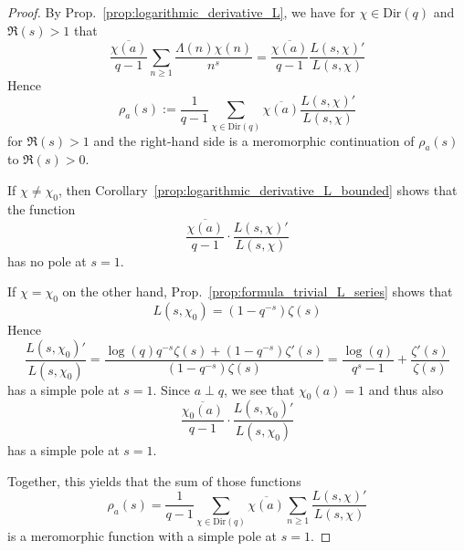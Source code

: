 \documentclass{scrartcl}
\theoremstyle{definition}
\begin{document}
\begin{proof}
    By Prop.~\ref{prop:logarithmic_derivative_L}, we have for $\chi \in \mathrm{Dir}(q)$ and $\Re(s) > 1$ that
    \begin{equation*}
        \frac {\overline{\chi(a)}} {q - 1} \sum_{n \geq 1} \frac {\Lambda(n) \chi(n)} {n^s} = \frac {\overline{\chi(a)}} {q - 1} \frac {L(s, \chi)'} {L(s, \chi)}
    \end{equation*}
    Hence
    \begin{equation*}
        \rho_a(s) := \frac 1 {q - 1} \sum_{\chi \in \mathrm{Dir}(q)} \overline{\chi(a)} \frac {L(s, \chi)'} {L(s, \chi)}
    \end{equation*}
    for $\Re(s) > 1$ and the right-hand side is a meromorphic continuation of $\rho_a(s)$ to $\Re(s) > 0$.

    If $\chi \neq \chi_0$, then Corollary~\ref{prop:logarithmic_derivative_L_bounded} shows that the function
    \begin{equation*}
        \frac {\overline{\chi(a)}} {q - 1} \cdot \frac {L(s, \chi)'} {L(s, \chi)}
    \end{equation*}
    has no pole at $s = 1$.
    
    If $\chi = \chi_0$ on the other hand, Prop.~\ref{prop:formula_trivial_L_series} shows that
    \begin{equation*}
        L(s, \chi_0) = (1 - q^{-s}) \zeta(s)
    \end{equation*}
    Hence
    \begin{equation*}
        \frac {L(s, \chi_0)'} {L(s, \chi_0)} = \frac { \log(q)q^{-s} \zeta(s) + (1 - q^{-s}) \zeta'(s) } { (1 - q^{-s})\zeta(s) } = \frac {\log(q)} {q^s - 1} + \frac {\zeta'(s)} {\zeta(s)}
    \end{equation*}
    has a simple pole at $s = 1$.
    Since $a \perp q$, we see that $\chi_0(a) = 1$ and thus also
    \begin{equation*}
        \frac {\overline{\chi_0(a)}} {q - 1} \cdot \frac {L(s, \chi_0)'} {L(s, \chi_0)}
    \end{equation*}
    has a simple pole at $s = 1$.

    Together, this yields that the sum of those functions
    \begin{equation*}
        \rho_a(s) = \frac 1 {q - 1} \sum_{\chi \in \mathrm{Dir}(q)} \overline{\chi(a)} \sum_{n \geq 1} \frac {L(s, \chi)'} {L(s, \chi)}
    \end{equation*}
    is a meromorphic function with a simple pole at $s = 1$.
\end{proof}
\end{document}
